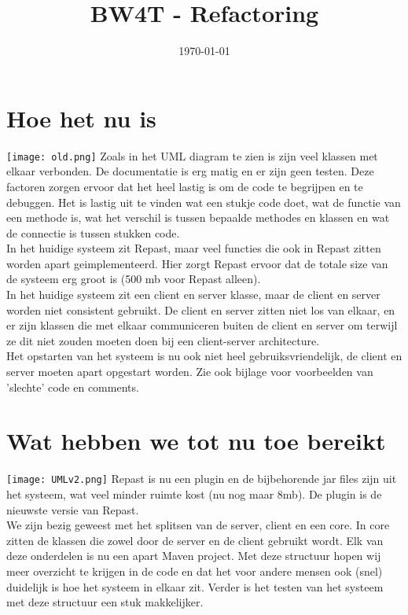 \documentclass[11pt,a4paper]{article}
\title{BW4T - Refactoring}
\date{\today}
\begin{document}
\maketitle

\section{Hoe het nu is}
\texttt{[image: old.png]}
Zoals in het UML diagram te zien is zijn veel klassen met elkaar verbonden. De documentatie is erg matig en er zijn geen testen. Deze factoren zorgen ervoor dat het heel lastig is om de code te begrijpen en te debuggen. Het is lastig uit te vinden wat een stukje code doet, wat de functie van een methode is, wat het verschil is tussen bepaalde methodes en klassen en wat de connectie is tussen stukken code. \\
In het huidige systeem zit Repast, maar veel functies die ook in Repast zitten worden apart geimplementeerd. Hier zorgt Repast ervoor dat de totale size van de systeem erg groot is (500 mb voor Repast alleen). \\
In het huidige systeem zit een client en server klasse, maar de client en server worden niet consistent gebruikt. De client en server zitten niet los van elkaar, en er zijn klassen die met elkaar communiceren buiten de client en server om terwijl ze dit niet zouden moeten doen bij een client-server architecture. \\
Het opstarten van het systeem is nu ook niet heel gebruiksvriendelijk, de client en server moeten apart opgestart worden. 
Zie ook bijlage voor voorbeelden van 'slechte' code en comments.

\section{Wat hebben we tot nu toe bereikt}
\texttt{[image: UMLv2.png]}
Repast is nu een plugin en de bijbehorende jar files zijn uit het systeem, wat veel minder ruimte kost (nu nog maar 8mb). De plugin is de nieuwste versie van Repast. \\
We zijn bezig geweest met het splitsen van de server, client en een core. In core zitten de klassen die zowel door de server en de client gebruikt wordt. Elk van deze onderdelen is nu een apart Maven project. Met deze structuur hopen wij meer overzicht te krijgen in de code en dat het voor andere mensen ook (snel) duidelijk is hoe het systeem in elkaar zit. Verder is het testen van het systeem met deze structuur een stuk makkelijker. 
\end{document}

